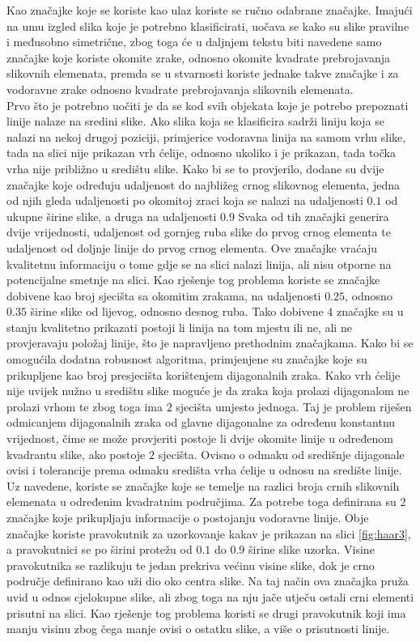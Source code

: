\documentclass[times, utf8, zavrsni, numeric]{fer}
\begin{document}
Kao značajke koje se koriste kao ulaz koriste se ručno odabrane značajke. 
Imajući na umu izgled slika koje je potrebno klasificirati, uočava se kako su slike pravilne i međusobno simetrične, zbog toga će u daljnjem tekstu biti navedene samo značajke koje koriste okomite zrake, odnosno okomite kvadrate prebrojavanja slikovnih elemenata, premda se u stvarnosti koriste jednake takve značajke i za vodoravne zrake odnosno kvadrate prebrojavanja slikovnih elemenata.\\

Prvo što je potrebno uočiti je da se kod svih objekata koje je potrebo prepoznati linije nalaze na sredini slike.
Ako slika koja se klasificira sadrži liniju koja se nalazi na nekoj drugoj poziciji, primjerice vodoravna linija na samom vrhu slike, tada na slici nije prikazan vrh ćelije, odnosno ukoliko i je prikazan, tada točka vrha nije približno u središtu slike.
Kako bi se to provjerilo, dodane su dvije značajke koje određuju udaljenost do najbližeg crnog slikovnog elementa, jedna od njih gleda udaljenosti po okomitoj zraci koja se nalazi na udaljenosti $0.1$ od ukupne širine slike, a druga na udaljenosti $0.9$
Svaka od tih značajki generira dvije vrijednosti, udaljenost od gornjeg ruba slike do prvog crnog elementa te udaljenost od doljnje linije do prvog crnog elementa.
Ove značajke vraćaju kvalitetnu informaciju o tome gdje se na slici nalazi linija, ali nisu otporne na potencijalne smetnje na slici.
Kao rješenje tog problema koriste se značajke dobivene kao broj sjecišta sa okomitim zrakama, na udaljenosti $0.25$, odnosno $0.35$ širine slike od lijevog, odnosno desnog ruba.
Tako dobivene $4$ značajke su u stanju kvalitetno prikazati postoji li linija na tom mjestu ili ne, ali ne provjeravaju položaj linije, što je napravljeno prethodnim značajkama.
Kako bi se omogućila dodatna robusnost algoritma, primjenjene su značajke koje su prikupljene kao broj presjecišta korištenjem dijagonalnih zraka.
Kako vrh ćelije nije uvijek nužno u središtu slike moguće je da zraka koja prolazi dijagonalom ne prolazi vrhom te zbog toga ima $2$ sjecišta umjesto jednoga.
Taj je problem riješen odmicanjem dijagonalnih zraka od glavne dijagonalne za određenu konstantnu vrijednost, čime se može provjeriti postoje li dvije okomite linije u određenom kvadrantu slike, ako postoje $2$ sjecišta.
Ovisno o odmaku od središnje dijagonale ovisi i tolerancije prema odmaku središta vrha ćelije u odnosu na središte linije.
Uz navedene, koriste se značajke koje se temelje na razlici broja crnih slikovnih elemenata u određenim kvadratnim područjima.
Za potrebe toga definirana su $2$ značajke koje prikupljaju informacije o postojanju vodoravne linije. 
Obje značajke koriste pravokutnik za uzorkovanje kakav je prikazan na slici \ref{fig:haar3}, a pravokutnici se po širini protežu od $0.1$ do $0.9$ širine slike uzorka.
Visine pravokutnika se razlikuju te jedan prekriva većinu visine slike, dok je crno područje definirano kao uži dio oko centra slike.
Na taj način ova značajka pruža uvid u odnos cjelokupne slike, ali zbog toga na nju jače utječu ostali crni elementi prisutni na slici.
Kao rješenje tog problema koristi se drugi pravokutnik koji ima manju visinu zbog čega manje ovisi o ostatku slike, a više o prisutnosti linije.
\end{document}
